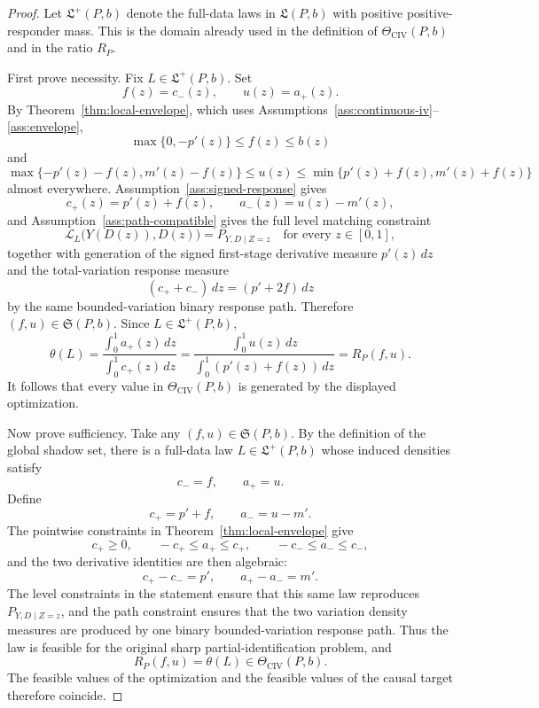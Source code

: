 \begin{proof}
Let \(\mathfrak L^+(P,b)\) denote the full-data laws in \(\mathfrak L(P,b)\)
with positive positive-responder mass.  This is the domain already used in
the definition of \(\Theta_{\mathrm{CIV}}(P,b)\) and in the ratio \(R_P\).

First prove necessity.  Fix \(L\in\mathfrak L^+(P,b)\).  Set
\[
f(z)=c_-(z),\qquad u(z)=a_+(z).
\]
By Theorem~\ref{thm:local-envelope}, which uses
Assumptions~\ref{ass:continuous-iv}--\ref{ass:envelope},
\[
\max\{0,-p'(z)\}\le f(z)\le b(z)
\]
and
\[
\max\{-p'(z)-f(z),m'(z)-f(z)\}\le u(z)\le
\min\{p'(z)+f(z),m'(z)+f(z)\}
\]
almost everywhere.  Assumption~\ref{ass:signed-response} gives
\[
c_+(z)=p'(z)+f(z),
\qquad
a_-(z)=u(z)-m'(z),
\]
and Assumption~\ref{ass:path-compatible} gives the full level matching
constraint
\[
\mathcal L_L\bigl(Y(D(z)),D(z)\bigr)=P_{Y,D\mid Z=z}
\quad\text{for every }z\in[0,1],
\]
together with generation of the signed first-stage derivative measure
\(p'(z)\,dz\) and the total-variation response measure
\[
(c_++c_-)\,dz=(p'+2f)\,dz
\]
by the same bounded-variation binary response path.  Therefore
\((f,u)\in\mathfrak S(P,b)\).  Since \(L\in\mathfrak L^+(P,b)\),
\[
\theta(L)=
\frac{\int_0^1 a_+(z)\,dz}{\int_0^1 c_+(z)\,dz}
=
\frac{\int_0^1 u(z)\,dz}
       {\int_0^1(p'(z)+f(z))\,dz}
=R_P(f,u).
\]
It follows that every value in \(\Theta_{\mathrm{CIV}}(P,b)\) is generated by
the displayed optimization.

Now prove sufficiency.  Take any \((f,u)\in\mathfrak S(P,b)\).  By the
definition of the global shadow set, there is a full-data law
\(L\in\mathfrak L^+(P,b)\) whose induced densities satisfy
\[
c_-=f,\qquad a_+=u.
\]
Define
\[
c_+=p'+f,\qquad a_-=u-m'.
\]
The pointwise constraints in Theorem~\ref{thm:local-envelope} give
\[
c_+\ge0,\qquad -c_+\le a_+\le c_+,\qquad -c_-\le a_-\le c_-,
\]
and the two derivative identities are then algebraic:
\[
c_+-c_-=p',\qquad a_+-a_-=m'.
\]
The level constraints in the statement ensure that this same law reproduces
\(P_{Y,D\mid Z=z}\), and the path constraint ensures that the two variation
density measures are produced by one binary bounded-variation response path.
Thus the law is feasible for the original sharp partial-identification
problem, and
\[
R_P(f,u)=\theta(L)\in\Theta_{\mathrm{CIV}}(P,b).
\]
The feasible values of the optimization and the feasible values of the causal
target therefore coincide.


\end{proof}
